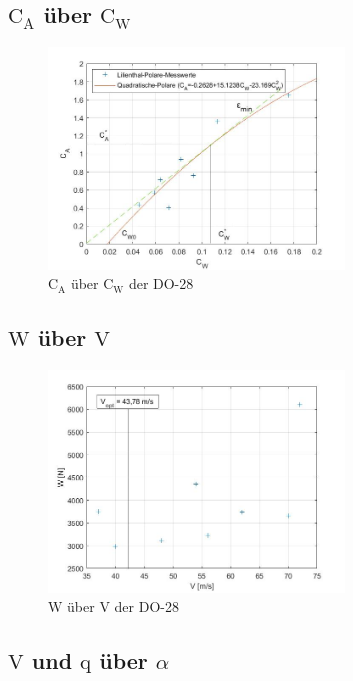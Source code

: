 \subsection{$\mathrm{C}_{\mathrm{A}}$ über $\mathrm{C}_{\mathrm{W}}$}

\begin{figure}[H]
	\centering	\includegraphics[width=0.7\textwidth]{./Bilder/CA_CW_DO28.jpg}
	\caption{$\mathrm{C}_{\mathrm{A}}$ über $\mathrm{C}_{\mathrm{W}}$ der DO-28}
	\label{fig:CA_CW_DO28}
\end{figure}

\subsection{$\mathrm{W}$ über $\mathrm{V}$}

\begin{figure}[H]
	\centering	\includegraphics[width=0.7\textwidth]{./Bilder/W_V_DO28.jpg}
	\caption{$\mathrm{W}$ über $\mathrm{V}$ der DO-28}
	\label{fig:W_V_DO28}
\end{figure}


\subsection{$\mathrm{V}$ und $\mathrm{q}$ über $\alpha$}

